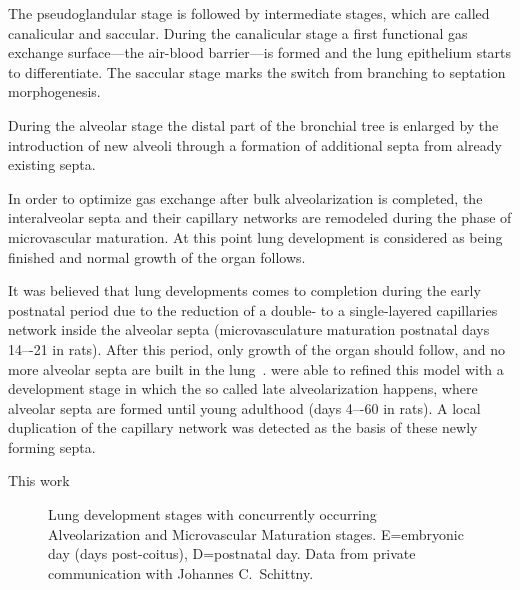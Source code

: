 The pseudoglandular stage is followed by intermediate stages, which are called canalicular and saccular. During the canalicular stage a first functional gas exchange surface---the air-blood barrier---is formed and the lung epithelium starts to differentiate. The saccular stage marks the switch from branching to septation morphogenesis.

During the alveolar stage the distal part of the bronchial tree is enlarged by the introduction of new alveoli through a formation of additional septa from already existing septa. 

In order to optimize gas exchange after bulk alveolarization is completed, the interalveolar septa and their capillary networks are remodeled during the phase of microvascular maturation. At this point lung development is considered as being finished and normal growth of the organ follows.

It was believed that lung developments comes to completion during the early postnatal period due to the reduction of a double- to a single-layered capillaries network inside the alveolar septa (microvasculature maturation postnatal days 14–-21 in rats). After this period, only growth of the organ should follow, and no more alveolar septa are built in the lung~\cite{Burri1999,Schittny2004}. \citet{Schittny2008} were able to refined this model with a development stage in which the so called late alveolarization happens, where alveolar septa are formed until young adulthood (days 4–-60 in rats). A local duplication of the capillary network was detected as the basis of these newly forming septa.

This work 

\begin{figure}[h!]
	\centering
	\caption[Lung development stages]{Lung development stages with concurrently occurring Alveolarization and Microvascular Maturation stages. E=embryonic day (days post-coitus), D=postnatal day. Data from private communication with Johannes C.\ Schittny.}
	\label{fig:lung development stages new}
\end{figure}

